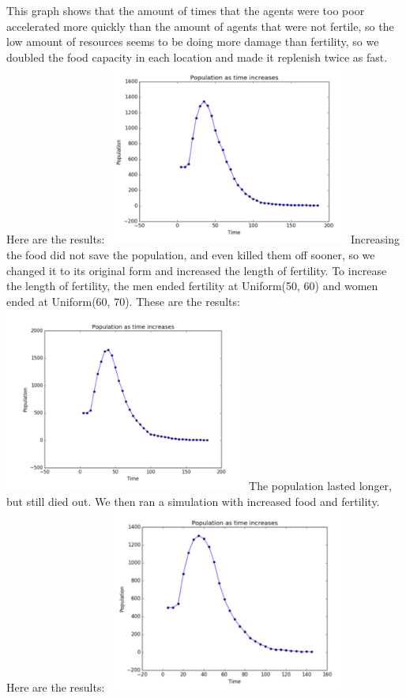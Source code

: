 \documentclass[11pt]{article}
\begin{document}
\begin{multicols}{2}
This graph shows that the amount of times that the agents were too poor accelerated more quickly than the amount of agents that were not fertile, so the low amount of resources seems to be doing more damage than fertility, so we doubled the food capacity in each location and made it replenish twice as fast. Here are the results: \newline
\includegraphics[width=80mm]{FoodCange.PNG} \newline
Increasing the food did not save the population, and even killed them off sooner, so we changed it to its original form and increased the length of fertility. To increase the length of fertility, the men ended fertility at Uniform(50, 60) and women ended at Uniform(60, 70). These are the results: \newline
\includegraphics[width=80mm]{FertChange.PNG} \newline
The population lasted longer, but still died out. We then ran a simulation with increased food and fertility. Here are the results: \newline
\includegraphics[width=80mm]{both.PNG} \newline

\end{multicols}
\end{document}
